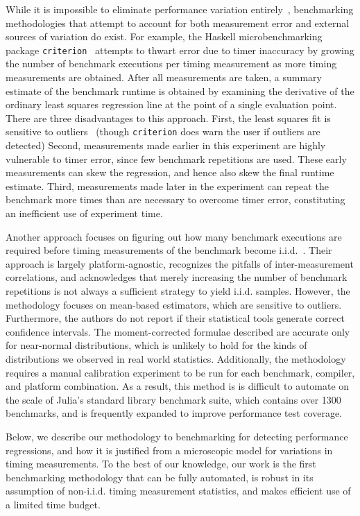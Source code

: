 \documentclass[conference]{IEEEtran}
\begin{document}
While it is impossible to eliminate performance variation
entirely~\cite{Alcocer2015,Barrett2016}, benchmarking methodologies that attempt to account
for both measurement error and external sources of variation do exist. For example, the
Haskell microbenchmarking package \lstinline|criterion|~\cite{criterion} attempts to thwart
error due to timer inaccuracy by growing the number of benchmark executions per timing
measurement as more timing measurements are obtained. After all measurements are taken, a
summary estimate of the benchmark runtime is obtained by examining the derivative of the
ordinary least squares regression line at the point of a single evaluation point. There are
three disadvantages to this approach. First, the least squares fit is sensitive to
outliers~\cite{Maronna2006} (though \lstinline|criterion| does warn the user if outliers are
detected) Second, measurements made earlier in this experiment are highly vulnerable to
timer error, since few benchmark repetitions are used. These early measurements can skew the
regression, and hence also skew the final runtime estimate. Third, measurements made later in
the experiment can repeat the benchmark more times than are necessary to overcome timer
error, constituting an inefficient use of experiment time.

Another approach focuses on figuring out how many benchmark executions are required before
timing measurements of the benchmark become i.i.d.~\cite{Kalibera2013}. Their approach is
largely platform-agnostic, recognizes the pitfalls of inter-measurement correlations, and
acknowledges that merely increasing the number of benchmark repetitions is not always a
sufficient strategy to yield i.i.d. samples. However, the methodology focuses on mean-based
estimators, which are sensitive to outliers. Furthermore, the authors do not report if their
statistical tools generate correct confidence intervals. The moment-corrected formulae
described are accurate only for near-normal distributions, which is unlikely to hold for the
kinds of distributions we observed in real world statistics. Additionally, the methodology
requires a manual calibration experiment to be run for each benchmark, compiler, and
platform combination. As a result, this method is is difficult to automate on the scale of
Julia's standard library benchmark suite, which contains over 1300 benchmarks, and is
frequently expanded to improve performance test coverage.

Below, we describe our methodology to benchmarking for detecting performance regressions,
and how it is justified from a microscopic model for variations in timing measurements. To
the best of our knowledge, our work is the first benchmarking methodology that can be fully
automated, is robust in its assumption of non-i.i.d. timing measurement statistics, and
makes efficient use of a limited time budget.
\end{document}
